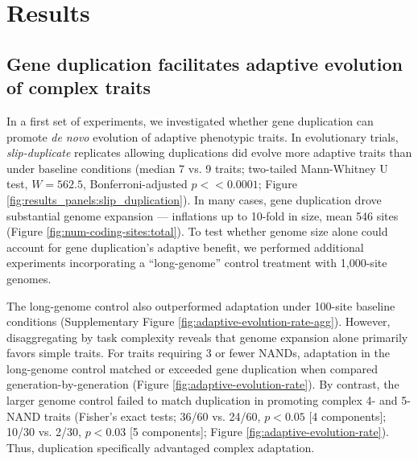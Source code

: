 \section{Results} \label{sec:results}

\subsection{Gene duplication facilitates adaptive evolution of complex traits}



In a first set of experiments, we investigated whether gene duplication can promote \textit{de novo} evolution of adaptive phenotypic traits.
In evolutionary trials, \textit{slip-duplicate} replicates allowing duplications did evolve more adaptive traits than under baseline conditions (median 7 vs. 9 traits; two-tailed Mann-Whitney U test, $W = 562.5$, Bonferroni-adjusted $p << 0.0001$; Figure \ref{fig:results_panels:slip_duplication}).
In many cases, gene duplication drove substantial genome expansion --- inflations up to 10-fold in size, mean 546 sites (Figure \ref{fig:num-coding-sites:total}).
To test whether genome size alone could account for gene duplication's adaptive benefit, we performed additional experiments incorporating a ``long-genome'' control treatment with 1,000-site genomes.



The long-genome control also outperformed adaptation under 100-site baseline conditions (Supplementary Figure \ref{fig:adaptive-evolution-rate-agg}).
However, disaggregating by task complexity reveals that genome expansion alone primarily favors simple traits.
For traits requiring 3 or fewer NANDs, adaptation in the long-genome control matched or exceeded gene duplication when compared generation-by-generation (Figure \ref{fig:adaptive-evolution-rate}).
By contrast, the larger genome control failed to match duplication in promoting complex 4- and 5-NAND traits (Fisher's exact tests; 36/60 vs. 24/60, $p<0.05$ [4 components]; 10/30 vs. 2/30, $p<0.03$ [5 components]; Figure \ref{fig:adaptive-evolution-rate}).
Thus, duplication specifically advantaged complex adaptation.

